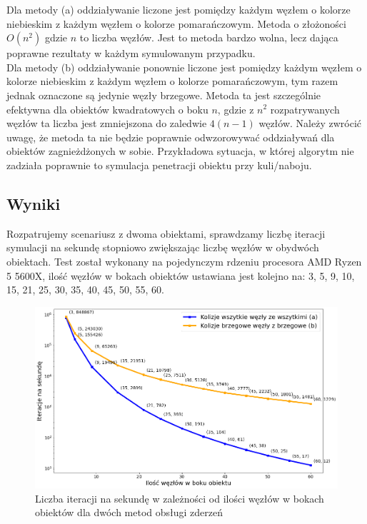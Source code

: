 \documentclass[12pt, letterpaper]{report}
\begin{document}
    Dla metody (a) oddziaływanie liczone jest pomiędzy każdym węzłem o kolorze niebieskim z każdym węzłem o
    kolorze pomarańczowym. Metoda o złożoności $O(n^2)$ gdzie $n$ to liczba węzłów.
    Jest to metoda bardzo wolna, lecz dająca poprawne rezultaty w każdym symulowanym przypadku.\\

    Dla metody (b) oddziaływanie ponownie liczone jest pomiędzy każdym węzłem o kolorze niebieskim z każdym
    węzłem o kolorze pomarańczowym, tym razem jednak oznaczone są jedynie węzły brzegowe.
    Metoda ta jest szczególnie efektywna dla obiektów kwadratowych o boku $n$, gdzie z $n^2$
    rozpatrywanych węzłów ta liczba jest zmniejszona do zaledwie $4(n-1)$ węzłów.
    Należy zwrócić uwagę, że metoda ta nie będzie poprawnie odwzorowywać oddziaływań dla
    obiektów zagnieżdżonych w sobie. Przykładowa sytuacja, w której algorytm nie zadziała poprawnie
    to symulacja penetracji obiektu przy kuli/naboju.

    \newpage
    \subsection{Wyniki}
    Rozpatrujemy scenariusz z dwoma obiektami, sprawdzamy liczbę iteracji symulacji na sekundę stopniowo
    zwiększając liczbę węzłów w obydwóch obiektach. Test został wykonany na pojedynczym rdzeniu procesora AMD Ryzen 5 5600X, 
    ilość węzłów w bokach obiektów ustawiana jest kolejno na: 3, 5, 9, 10, 15, 21, 25, 30, 35, 40, 45, 50, 55, 60.

    \begin{figure}[h]
        \centering
        \includegraphics[width=15cm]{performance_side_size}
        \caption{
            Liczba iteracji na sekundę w zależności od 
            ilości węzłów w bokach obiektów dla dwóch metod obsługi zderzeń
        }
    \end{figure}
\end{document}
